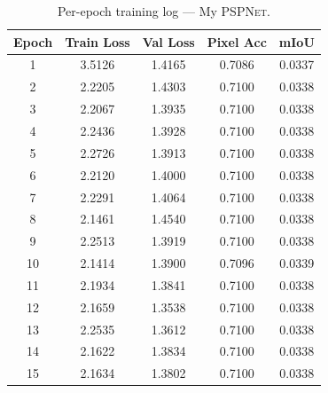 \documentclass[12pt,a4paper]{article}
\newcommand{\pspnet}{\textsc{PSPNet}}
\newcommand{\mypsp}{My \pspnet{}}
\begin{document}
\begin{table}[H]
\centering
\caption{Per-epoch training log — \mypsp{}.}
\label{tab:log_my}
\small
\begin{tabular}{ccccc}
\toprule
\textbf{Epoch} & \textbf{Train Loss} & \textbf{Val Loss} & \textbf{Pixel Acc} & \textbf{mIoU} \\
\midrule
1  & 3.5126 & 1.4165 & 0.7086 & 0.0337 \\
2  & 2.2205 & 1.4303 & 0.7100 & 0.0338 \\
3  & 2.2067 & 1.3935 & 0.7100 & 0.0338 \\
4  & 2.2436 & 1.3928 & 0.7100 & 0.0338 \\
5  & 2.2726 & 1.3913 & 0.7100 & 0.0338 \\
6  & 2.2120 & 1.4000 & 0.7100 & 0.0338 \\
7  & 2.2291 & 1.4064 & 0.7100 & 0.0338 \\
8  & 2.1461 & 1.4540 & 0.7100 & 0.0338 \\
9  & 2.2513 & 1.3919 & 0.7100 & 0.0338 \\
10 & 2.1414 & 1.3900 & 0.7096 & 0.0339 \\
11 & 2.1934 & 1.3841 & 0.7100 & 0.0338 \\
12 & 2.1659 & 1.3538 & 0.7100 & 0.0338 \\
13 & 2.2535 & 1.3612 & 0.7100 & 0.0338 \\
14 & 2.1622 & 1.3834 & 0.7100 & 0.0338 \\
15 & 2.1634 & 1.3802 & 0.7100 & 0.0338 \\
\bottomrule
\end{tabular}
\end{table}
\end{document}
